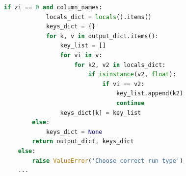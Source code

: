 \documentclass[a4paper,fleqn]{cas-sc}
\begin{document}
\begin{lstlisting}[language=Python, caption={Absorption Column Function}, label={lst:abs_column}]
        if zi == 0 and column_names:
            locals_dict = locals().items()
            keys_dict = {}
            for k, v in output_dict.items():
                key_list = []
                for vi in v:
                    for k2, v2 in locals_dict:
                        if isinstance(v2, float):
                            if vi == v2:
                                key_list.append(k2)
                                continue
                keys_dict[k] = key_list
        else:
            keys_dict = None
        return output_dict, keys_dict
    else:
        raise ValueError('Choose correct run type')
    ...

    \end{lstlisting}
\end{document}
